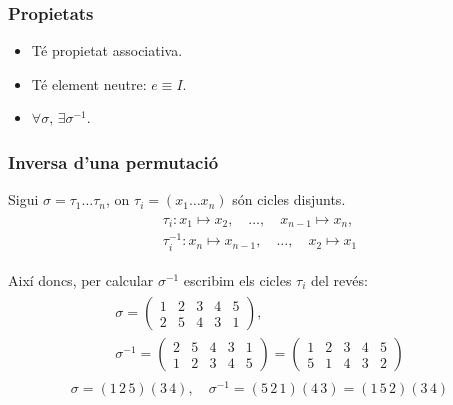 \subsubsection*{Propietats}
\begin{itemize}
    \item Té propietat associativa.
    \item Té element neutre: $e \equiv I$.
    \item $\forall \sigma, \, \exists \sigma^{-1}$.
\end{itemize}

\subsubsection*{Inversa d'una permutació}
Sigui $\sigma = \tau_{1} \dots \tau_{n}$, on $\tau_{i} = (x_{1} \dots x_{n})$ són cicles disjunts. 
\begin{align*}
\begin{gathered}
    \tau_{i}: x_{1} \mapsto x_{2}, \quad \dots , \quad x_{n-1} \mapsto x_{n}, \\
    \tau_{i}^{-1}: x_{n} \mapsto x_{n-1}, \quad \dots , \quad x_{2} \mapsto x_{1}
\end{gathered}
\end{align*}

Així doncs, per calcular $\sigma^{-1}$ escribim els cicles $\tau_{i}$ del revés:
\begin{align}
\begin{gathered}
    \sigma = \begin{pmatrix}1 & 2 & 3 & 4 & 5 \\ 2 & 5 & 4 & 3 & 1\end{pmatrix},\\
    \sigma^{-1} = \begin{pmatrix}2 & 5 & 4 & 3 & 1\\ 1 & 2 & 3 & 4 & 5 \end{pmatrix} =\begin{pmatrix}1 & 2 & 3 & 4 & 5 \\ 5 & 1 & 4 & 3 & 2\end{pmatrix}
\end{gathered}
\end{align}
\begin{align}
    \sigma = (1 \, 2 \, 5) (3 \, 4), \quad \sigma^{-1} = (5 \, 2 \, 1) (4 \, 3) = (1 \, 5 \, 2) (3 \, 4)
\end{align}


